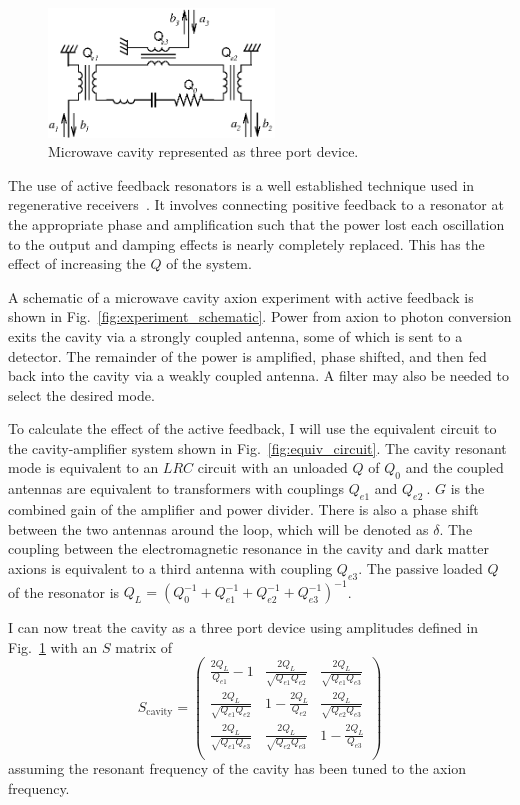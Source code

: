 \documentclass[aps,prl,twocolumn,groupedaddress]{revtex4-1}
\begin{document}
\begin{figure}
\includegraphics[width=6cm]{figs/amplitude_definitions.eps}
\caption{\label{fig:amplitude_defs} Microwave cavity represented as three port device.}
\end{figure}


The use of active feedback resonators is a well established technique used in regenerative receivers~\cite{armstrong1914wireless}.
It involves connecting positive feedback to a resonator at the appropriate phase and amplification such that the power lost each oscillation to the output and damping effects is nearly completely replaced.  
This has the effect of increasing the $Q$ of the system.

A schematic of a microwave cavity axion experiment with active feedback is shown in Fig.~\ref{fig:experiment_schematic}.   Power from axion to photon conversion exits the cavity via a strongly coupled antenna, some of which is sent to a detector.  The remainder of the power is amplified, phase shifted, and then fed back into the cavity via a weakly coupled antenna.  A filter may also be needed to select the desired mode. 

To calculate the effect of the active feedback, I will use the equivalent circuit to the cavity-amplifier system shown in Fig.~\ref{fig:equiv_circuit}.  The cavity resonant mode is equivalent to an $LRC$ circuit with an unloaded $Q$ of $Q_0$ and the coupled antennas are equivalent to transformers with couplings $Q_{e1}$ and $Q_{e2}~$\cite{Montgomery:1948}.  $G$ is the combined gain of the amplifier and power divider.  There is also a phase shift between the two antennas around the loop, which will be denoted as $\delta$.  The coupling between the electromagnetic resonance in the cavity and dark matter axions is equivalent to a third antenna with coupling $Q_{e3}$.  The passive loaded $Q$ of the resonator is $Q_L=\left(Q_0^{-1}+Q_{e1}^{-1}+Q_{e2}^{-1}+Q_{e3}^{-1}\right)^{-1}$.

I can now treat the cavity as a three port device using amplitudes defined in Fig.~\ref{fig:amplitude_defs} with an $S$ matrix of
\begin{equation}
S_{\mathrm{cavity}}=
\left( \begin{array}{ccc}
		\frac{2Q_L}{Q_{e1}}-1 & \frac{2Q_L}{\sqrt{Q_{e1}Q_{e2}}} & \frac{2Q_L}{\sqrt{Q_{e1}Q_{e3}}}  \\
		\frac{2Q_L}{\sqrt{Q_{e1}Q_{e2}}} & 1-\frac{2Q_L}{Q_{e2}} & \frac{2Q_L}{\sqrt{Q_{e2}Q_{e3}}}  \\
		\frac{2Q_L}{\sqrt{Q_{e1}Q_{e3}}} &  \frac{2Q_L}{\sqrt{Q_{e2}Q_{e3}}} &  1-\frac{2Q_L}{Q_{e3}} \\
		\end{array}\right)
\end{equation}
    assuming the resonant frequency of the cavity has been tuned to the axion frequency.
\end{document}
